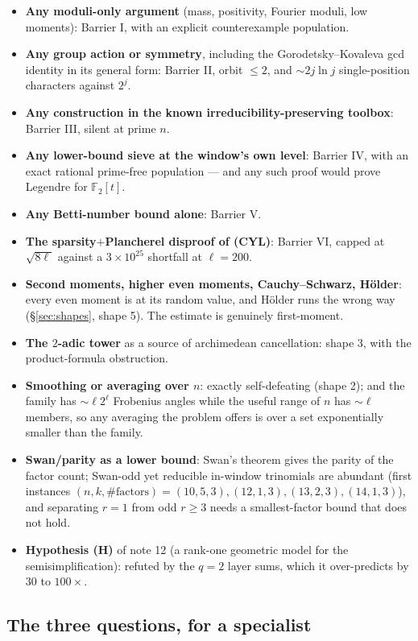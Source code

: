 \documentclass[10pt]{article}
\theoremstyle{plain}
\theoremstyle{definition}
\newcommand{\F}{\mathbb F}
\begin{document}
\begin{itemize}
\item \textbf{Any moduli-only argument} (mass, positivity, Fourier moduli, low
moments): Barrier I, with an explicit counterexample population.
\item \textbf{Any group action or symmetry}, including the
Gorodetsky--Kovaleva gcd identity in its general form: Barrier II, orbit
$\le2$, and $\sim2j\ln j$ single-position characters against $2^j$.
\item \textbf{Any construction in the known irreducibility-preserving
toolbox}: Barrier III, silent at prime $n$.
\item \textbf{Any lower-bound sieve at the window's own level}: Barrier IV,
with an exact rational prime-free population --- and any such proof would prove
Legendre for $\F_2[t]$.
\item \textbf{Any Betti-number bound alone}: Barrier V.
\item \textbf{The sparsity$+$Plancherel disproof of (CYL)}: Barrier VI, capped
at $\sqrt{8\ell}$ against a $3\times10^{25}$ shortfall at $\ell=200$.
\item \textbf{Second moments, higher even moments, Cauchy--Schwarz, H\"older}:
every even moment is at its random value, and H\"older runs the wrong way
(\S\ref{sec:shapes}, shape 5). The estimate is genuinely first-moment.
\item \textbf{The $2$-adic tower} as a source of archimedean cancellation:
shape 3, with the product-formula obstruction.
\item \textbf{Smoothing or averaging over $n$}: exactly self-defeating (shape
2); and the family has $\sim\ell2^{\ell}$ Frobenius angles while the useful
range of $n$ has $\sim\ell$ members, so any averaging the problem offers is over
a set exponentially smaller than the family.
\item \textbf{Swan/parity as a lower bound}: Swan's theorem gives the parity of
the factor count; Swan-odd yet reducible in-window trinomials are abundant
(first instances $(n,k,\#\mathrm{factors})=(10,5,3),(12,1,3),(13,2,3),(14,1,3)$),
and separating $r=1$ from odd $r\ge3$ needs a smallest-factor bound that does
not hold.
\item \textbf{Hypothesis (H)} of note 12 (a rank-one geometric model for the
semisimplification): refuted by the $q=2$ layer sums, which it over-predicts by
$30$ to $100\times$.
\end{itemize}

\subsection{The three questions, for a specialist}\label{sec:questions}
\end{document}
